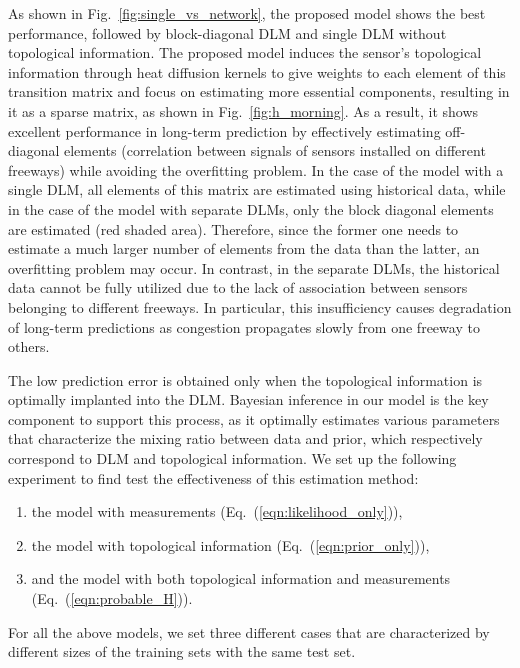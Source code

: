 \documentclass[journal]{IEEEtran}
\begin{document}
As shown in Fig.~\ref{fig:single_vs_network}, the proposed model shows the best performance, followed by block-diagonal DLM and single DLM without topological information.
The proposed model induces the sensor's topological information through heat diffusion kernels to give weights to each element of this transition matrix and focus on estimating more essential components, resulting in it as a sparse matrix, as shown in Fig.~\ref{fig:h_morning}. As a result, it shows excellent performance in long-term prediction by effectively estimating off-diagonal elements (correlation between signals of sensors installed on different freeways) while avoiding the overfitting problem.
In the case of the model with a single DLM, all elements of this matrix are estimated using historical data, while in the case of the model with separate DLMs, only the block diagonal elements are estimated (red shaded area). Therefore, since the former one needs to estimate a much larger number of elements from the data than the latter, an overfitting problem may occur. 
In contrast, in the separate DLMs, the historical data cannot be fully utilized due to the lack of association between sensors belonging to different freeways. In particular, this insufficiency causes degradation of long-term predictions as congestion propagates slowly from one freeway to others.

The low prediction error is obtained only when the topological information is optimally implanted into the DLM. Bayesian inference in our model is the key component to support this process, as it optimally estimates various parameters that characterize the mixing ratio between data and prior, which respectively correspond to DLM and topological information. We set up the following experiment to find test the effectiveness of this estimation method:
\begin{enumerate}
\item the model with measurements (Eq.~(\ref{eqn:likelihood_only})),
\item the model with topological information (Eq.~(\ref{eqn:prior_only})),
\item and the model with both topological information and measurements (Eq.~(\ref{eqn:probable_H})).
\end{enumerate}
For all the above models, we set three different cases that are characterized by different sizes of the training sets with the same test set.
\end{document}
